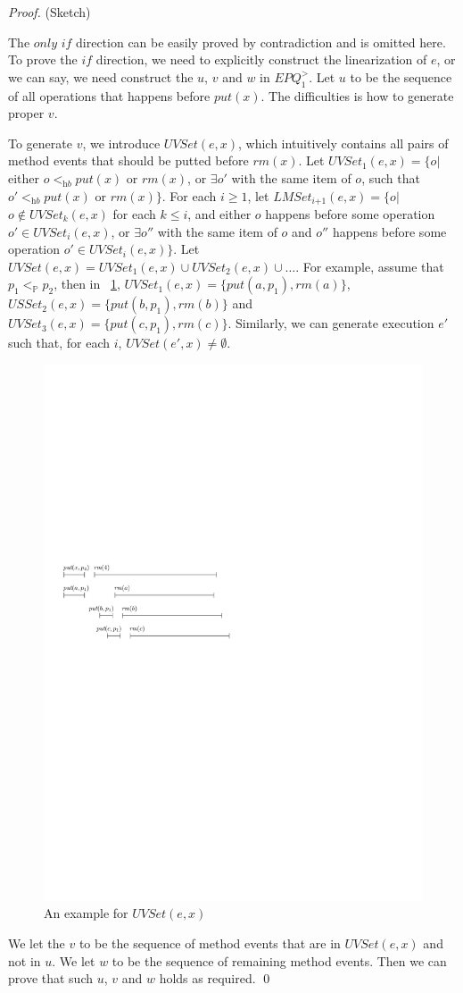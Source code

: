 \begin {proof} (Sketch)

The $\textit{only if}$ direction can be easily proved by contradiction and is omitted here. To prove the $\textit{if}$ direction, we need to explicitly construct the linearization of $e$, or we can say, we need construct the $u$, $v$ and $w$ in $\textit{EPQ}_1^{>}$. Let $u$ to be the sequence of all operations that happens before $\textit{put}(x)$. The difficulties is how to generate proper $v$.

To generate $v$, we introduce $\textit{UVSet}(e,x)$, which intuitively contains all pairs of method events that should be putted before $\textit{rm}(x)$. Let $\textit{UVSet}_1(e,x)= \{ o \vert$ either $o <_{\textit{hb}} \textit{put}(x)$ or $\textit{rm}(x)$, or $\exists o'$ with the same item of $o$, such that $o' <_{\textit{hb}} \textit{put}(x)$ or $\textit{rm}(x)\}$. For each $i \geq 1$, let $\textit{LMSet}_{\textit{i+1}}(e,x) = \{ o \vert$ $o \notin \textit{UVSet}_k(e,x)$ for each $k \leq i$, and either $o$ happens before some operation $o' \in \textit{UVSet}_i(e,x)$, or $\exists o''$ with the same item of $o$ and $o''$ happens before some operation $o' \in \textit{UVSet}_i(e,x)\}$. Let $\textit{UVSet}(e,x) = \textit{UVSet}_1(e,x) \cup \textit{UVSet}_2(e,x) \cup \ldots$. For example, assume that $p_1 <_{\mathbb{P}} p_2$, then in \figurename~\ref{fig:his nobound of UVSet}, $\textit{UVSet}_1(e,x) = \{ \textit{put}(a,p_1),\textit{rm}(a) \}$, $\textit{USSet}_2(e,x) = \{ \textit{put}(b,p_1),\textit{rm}(b) \}$ and $\textit{UVSet}_3(e,x) = \{ \textit{put}(c,p_1),\textit{rm}(c) \}$. Similarly, we can generate execution $e'$ such that, for each $i$, $\textit{UVSet}(e',x) \neq \emptyset$.


\begin{figure}[htbp]
  \centering
  \includegraphics[width=0.5 \textwidth]{figures/PIC_HIS_NOBOUNDOF_UVSET.pdf}
  \caption{An example for $\textit{UVSet}(e,x)$}
  \label{fig:his nobound of UVSet}
\end{figure}

We let the $v$ to be the sequence of method events that are in $\textit{UVSet}(e,x)$ and not in $u$. We let $w$ to be the sequence of remaining method events. Then we can prove that such $u$, $v$ and $w$ holds as required. \qed
\end {proof}


